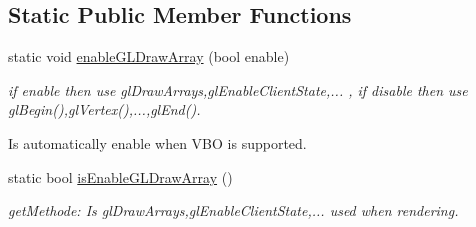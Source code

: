 \subsection*{Static Public Member Functions}
\begin{DoxyCompactItemize}
\item 
static void \hyperlink{class_f2_c_1_1_sprite_aa237fe3dca3002ea876865cfde83bfa3}{enableGLDrawArray} (bool enable)
\begin{DoxyCompactList}\small\item\em if enable then use glDrawArrays,glEnableClientState,... , if disable then use glBegin(),glVertex(),...,glEnd(). \par
 Is automatically enable when VBO is supported. \item\end{DoxyCompactList}\item 
\hypertarget{class_f2_c_1_1_sprite_ae5bff6a95dbabc64de9143e59c708ab4}{
static bool \hyperlink{class_f2_c_1_1_sprite_ae5bff6a95dbabc64de9143e59c708ab4}{isEnableGLDrawArray} ()}
\label{class_f2_c_1_1_sprite_ae5bff6a95dbabc64de9143e59c708ab4}

\begin{DoxyCompactList}\small\item\em getMethode: Is glDrawArrays,glEnableClientState,... used when rendering. \item\end{DoxyCompactList}\end{DoxyCompactItemize}
